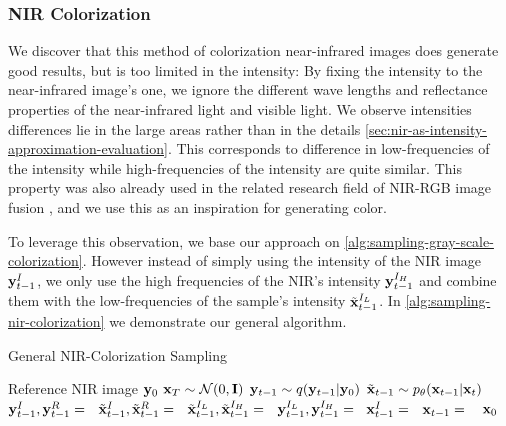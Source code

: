\subsubsection{NIR Colorization}
\label{sec:correction-guided-sampling-nir-colorization}

We discover that this method of colorization near-infrared images does generate good results, but is too limited in the intensity:
By fixing the intensity to the near-infrared image's one, we ignore the different wave lengths and reflectance properties of the near-infrared light and visible light.
We observe intensities differences lie in the large areas rather than in the details \autoref{sec:nir-as-intensity-approximation-evaluation}.
This corresponds to difference in low-frequencies of the intensity while high-frequencies of the intensity are quite similar.
This property was also already used in the related research field of NIR-RGB image fusion \parencite{study-vis-nir-fusion},
and we use this as an inspiration for generating color.

To leverage this observation, we base our approach on \autoref{alg:sampling-gray-scale-colorization}.
However instead of simply using the intensity of the NIR image $\mathbf{y}_{t-1}^I$, we only use the high frequencies of the NIR's intensity $\mathbf{y}_{t-1}^{I_H}$
and combine them with the low-frequencies of the sample's intensity $\tilde{\mathbf{x}}_{t-1}^{I_L}$.
In \autoref{alg:sampling-nir-colorization} we demonstrate our general algorithm.

\begin{algorithm}[htp!]
   \caption{General NIR-Colorization Sampling}
   \label{alg:sampling-nir-colorization}
   \begin{algorithmic}
      \Require Reference NIR image $\mathbf{y}_0$
      \State $\mathbf{x}_T \sim \mathcal{N}(0, \mathbf{I})$
      \State $\mathbf{y}_{t-1} \sim q(\mathbf{y}_{t-1}| \mathbf{y}_0)$
      \State $\tilde{\mathbf{x}}_{t-1} \sim p_\theta(\mathbf{x}_{t-1}|\mathbf{x}_t)$
      \State $\mathbf{y}_{t-1}^I, \mathbf{y}_{t-1}^R = $\ 
      \State $\tilde{\mathbf{x}}_{t-1}^I, \tilde{\mathbf{x}}_{t-1}^R=$\ 
      \State $\tilde{\mathbf{x}}_{t-1}^{I_L}, \tilde{\mathbf{x}}_{t-1}^{I_H} =$\ 
      \State $\mathbf{y}_{t-1}^{I_L}, \mathbf{y}_{t-1}^{I_H} =$\ 
      \State $\mathbf{x}_{t-1}^I =$\ 
      \State $\mathbf{x}_{t-1}=$ \ 
      \EndFor
      \Return $\mathbf{x}_0$
   \end{algorithmic}
\end{algorithm}

